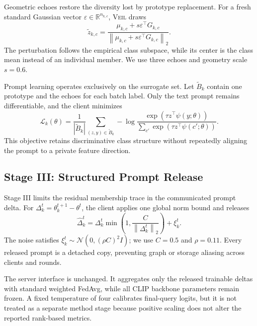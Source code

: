 \documentclass[letterpaper]{article}
\newcommand{\method}{\textsc{Veil}}
\newcommand{\norm}[1]{\left\lVert #1 \right\rVert_2}
\begin{document}
Geometric echoes restore the diversity lost by prototype replacement.  For a
fresh standard Gaussian vector $\varepsilon\in\mathbb{R}^{n_{k,c}}$, \method{}
draws
\begin{equation}
\widetilde z_{k,c}=\frac{\mu_{k,c}+s\varepsilon^\top G_{k,c}}
{\norm{\mu_{k,c}+s\varepsilon^\top G_{k,c}}}.
\label{eq:echo}
\end{equation}
The perturbation follows the empirical class subspace, while its center is the
class mean instead of an individual member.  We use three echoes and geometry
scale $s=0.6$.

Prompt learning operates exclusively on the surrogate set.  Let
$\widetilde B_k$ contain one prototype and the echoes for each batch label.
Only the text prompt remains differentiable, and the client minimizes
\begin{equation}
\mathcal{L}_{k}(\theta)=\frac{1}{|\widetilde B_k|}
\sum_{(z,y)\in\widetilde B_k}
-\log\frac{\exp\!\left(\tau z^\top\psi(y;\theta)\right)}
{\sum_{c'}\exp\!\left(\tau z^\top\psi(c';\theta)\right)}.
\label{eq:objective}
\end{equation}
This objective retains discriminative class structure without repeatedly
aligning the prompt to a private feature direction.

\subsection{Stage III: Structured Prompt Release}

Stage III limits the residual membership trace in the communicated prompt
delta.  For $\Delta_k^t=\theta_k^{t+1}-\theta^t$, the client applies one global
norm bound and releases
\begin{equation}
\widehat{\Delta}_k^t=\Delta_k^t
\min\left(1,\frac{C}{\norm{\Delta_k^t}}\right)+\xi_k^t.
\label{eq:delta-release}
\end{equation}
The noise satisfies $\xi_k^t\sim\mathcal{N}(0,(\rho C)^2I)$; we use $C=0.5$ and
$\rho=0.11$.  Every released prompt is a detached copy, preventing graph or
storage aliasing across clients and rounds.

The server interface is unchanged.  It aggregates only the released trainable
deltas with standard weighted FedAvg, while all CLIP backbone parameters remain
frozen.  A fixed temperature of four calibrates final-query logits, but it is
not treated as a separate method stage because positive scaling does not alter
the reported rank-based metrics.
\end{document}
